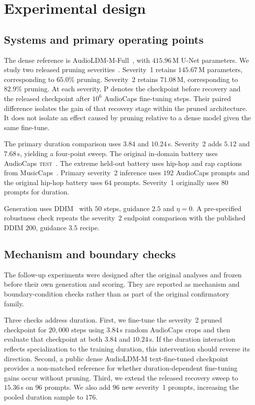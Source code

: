 \section{Experimental design}
\subsection{Systems and primary operating points}
The dense reference is AudioLDM-M-Full~\cite{liu2023audioldm}, with $415.96$\,M U-Net parameters. We study two released pruning severities~\cite{singh2026pruning}. Severity~1 retains $145.67$\,M parameters, corresponding to $65.0\%$ pruning. Severity~2 retains $71.08$\,M, corresponding to $82.9\%$ pruning. At each severity, P denotes the checkpoint before recovery and \PFT{} the released checkpoint after $10^{6}$ AudioCaps fine-tuning steps. Their paired difference isolates the gain of that recovery stage within the pruned architecture. It does not isolate an effect caused by pruning relative to a dense model given the same fine-tune.

The primary duration comparison uses $3.84$ and $10.24$\,s. Severity~2 adds $5.12$ and $7.68$\,s, yielding a four-point sweep. The original in-domain battery uses AudioCaps \textsc{test}~\cite{kim2019audiocaps}. The extreme held-out battery uses hip-hop and rap captions from MusicCaps~\cite{agostinelli2023musiclm}. Primary severity~2 inference uses $192$ AudioCaps prompts and the original hip-hop battery uses $64$ prompts. Severity~1 originally uses $80$ prompts for duration.

Generation uses DDIM~\cite{song2021ddim} with $50$ steps, guidance $2.5$ and $\eta=0$. A pre-specified robustness check repeats the severity~2 endpoint comparison with the published DDIM $200$, guidance $3.5$ recipe.

\subsection{Mechanism and boundary checks}
The follow-up experiments were designed after the original analyses and frozen before their own generation and scoring. They are reported as mechanism and boundary-condition checks rather than as part of the original confirmatory family.

Three checks address duration. First, we fine-tune the severity~2 pruned checkpoint for $20{,}000$ steps using $3.84$\,s random AudioCaps crops and then evaluate that checkpoint at both $3.84$ and $10.24$\,s. If the duration interaction reflects specialization to the training duration, this intervention should reverse its direction. Second, a public dense AudioLDM-M text-fine-tuned checkpoint provides a non-matched reference for whether duration-dependent fine-tuning gains occur without pruning. Third, we extend the released recovery sweep to $15.36$\,s on $96$ prompts. We also add $96$ new severity~1 prompts, increasing the pooled duration sample to $176$.

